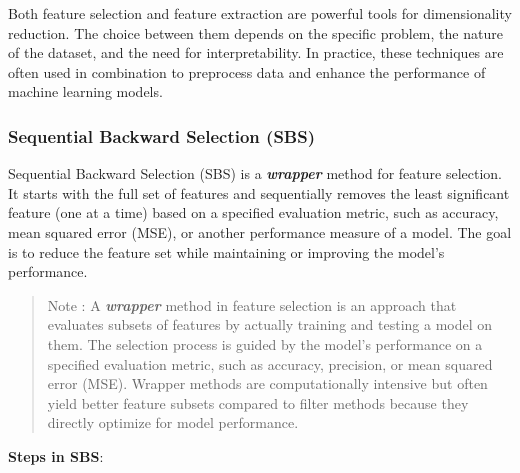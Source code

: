 \documentclass{article}
\begin{document}
Both feature selection and feature extraction are powerful tools for
dimensionality reduction. The choice between them depends on the
specific problem, the nature of the dataset, and the need for
interpretability. In practice, these techniques are often used in
combination to preprocess data and enhance the performance of machine
learning models.

    \subsubsection{Sequential Backward Selection
(SBS)}\label{sequential-backward-selection-sbs}

Sequential Backward Selection (SBS) is a \textbf{\emph{wrapper}} method
for feature selection. It starts with the full set of features and
sequentially removes the least significant feature (one at a time) based
on a specified evaluation metric, such as accuracy, mean squared error
(MSE), or another performance measure of a model. The goal is to reduce
the feature set while maintaining or improving the model's performance.

\begin{quote}
Note : A \textbf{\emph{wrapper}} method in feature selection is an
approach that evaluates subsets of features by actually training and
testing a model on them. The selection process is guided by the model's
performance on a specified evaluation metric, such as accuracy,
precision, or mean squared error (MSE). Wrapper methods are
computationally intensive but often yield better feature subsets
compared to filter methods because they directly optimize for model
performance.
\end{quote}

\textbf{Steps in SBS}:
\end{document}
